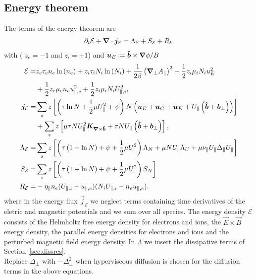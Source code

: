 \subsection{Energy theorem}
The terms of the energy theorem are
\begin{align} \label{eq:energy_theorem}
\partial_t \mathcal E +
{\boldsymbol{\nabla}}\cdot {\boldsymbol{j}}_{\mathcal E}
= \Lambda_{\mathcal E}
+  S_{\mathcal E}
+  R_{\mathcal E}
\end{align}
with ( $z_e=-1$ and $z_i=+1$) and ${\boldsymbol{u}}_E := {\bm{\hat{b}}\times {\boldsymbol{\nabla}}\phi}/{B}$
\begin{align} \label{eq:energy_conservation}
  \mathcal{E}= & z_e\tau_e n_e \ln{(n_e)} +z_i\tau_i N_i\ln{(N_i)}
  +\frac{1}{2\beta}\left({\boldsymbol{\nabla}}_{\perp} A_\parallel\right)^2
   +  \frac{1}{2} z_i \mu_i N_i u_E^2  \nonumber\\
   & +\frac{1}{2} z_e\mu_e  n_e u_{\parallel,e}^2
  +\frac{1}{2} z_i\mu_i  N_i U_{\parallel,i}^2,\\
  {\boldsymbol{j}}_{\mathcal E} =& \sum_s z\left[
  \left(\tau \ln N + \frac{1}{2}\mu U_\parallel^2 + \psi \right)N\left(
  {\boldsymbol{u}}_E + {\boldsymbol{u}}_C + {\boldsymbol{u}}_{K} +U_\parallel\left(\bm{\hat{b}}+{{\boldsymbol{b}}}_\perp\right)  \right) \right]
  \nonumber\\
  &+ \sum_z z\left[\mu \tau NU_\parallel^2{\boldsymbol{K}}_{{\boldsymbol{\nabla}}\times\bm{\hat{b}}} + \tau NU_\parallel \left(\bm{\hat{b}} + {{\boldsymbol{b}}}_\perp\right)\right], \\
  \Lambda_{\mathcal E} =&  \sum_s z\left[\left( \tau\left( 1+\ln{N}\right) + \psi + \frac{1}{2} \mu U_\parallel^2 \right)
  \Lambda_N  +  \mu NU_\parallel\Lambda_U + \mu \nu_\parallel U_\parallel \Delta_\parallel U_\parallel \right]
\nonumber \\
  S_{\mathcal E} =&  \sum_s  z\left[ \left(\tau\left( 1+\ln{N}\right) +\psi + \frac{1}{2} \mu U_\parallel^2 \right)S_{N}\right]
\nonumber \\
R_{\mathcal E} =&  -\eta_\parallel  n_e(U_{\parallel,i}-u_{\parallel,e})(N_iU_{\parallel,i} - n_eu_{\parallel,e}).
\end{align}
where in the energy flux $\vec j_{\mathcal E}$
we neglect terms  containing time derivatives
of the eletric and magnetic potentials and we sum over all species.
The energy density $\mathcal E$ consists of the Helmholtz free energy density for electrons and ions,
the \(\vec{E} \times \vec{B}\) energy density, the parallel energy densities for electrons and ions and the perturbed magnetic field energy density.
In \(\Lambda\) we insert the dissipative terms of Section~\ref{sec:dissres}. \\
Replace $\Delta_\perp$ with $-\Delta_\perp^2$ when hyperviscous diffusion is chosen
for the diffusion terms in the above equations.

